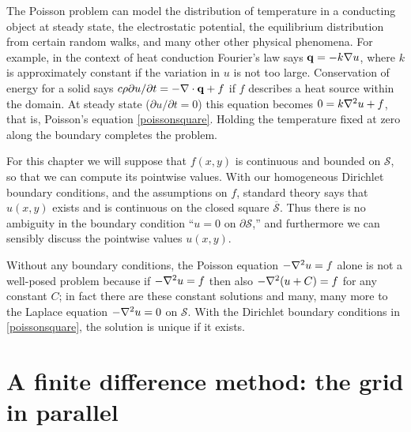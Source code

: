 The Poisson problem can model the distribution of temperature in a conducting object at steady state, the electrostatic potential, the equilibrium distribution from certain random walks, and many other other physical phenomena.  For example, in the context of heat conduction Fourier's law says $\mathbf{q} = -k \nabla u$, where $k$ is approximately constant if the variation in $u$ is not too large.  Conservation of energy for a solid says $c\rho \partial u/\partial t = - \nabla\cdot\mathbf{q} + f$ if $f$ describes a heat source within the domain.  At steady state ($\partial u/\partial t=0$) this equation becomes $0 = k \nabla^2 u + f$, that is, Poisson's equation \eqref{poissonsquare}.  Holding the temperature fixed at zero along the boundary completes the problem.

For this chapter we will suppose that $f(x,y)$ is continuous and bounded on $\mathcal{S}$, so that we can compute its pointwise values.  With our homogeneous Dirichlet boundary conditions, and the assumptions on $f$, standard theory says that $u(x,y)$ exists and is continuous on the closed square $\overline{\mathcal{S}}$.  Thus there is no ambiguity in the boundary condition ``$u=0$ on $\partial \mathcal{S}$,'' and furthermore we can sensibly discuss the pointwise values $u(x,y)$.

Without any boundary conditions, the Poisson equation $-\nabla^2 u = f$ alone is not a well-posed problem because if $-\nabla^2 u = f$ then also $-\nabla^2(u+C)=f$ for any constant $C$; in fact there are these constant solutions and many, many more to the Laplace equation $-\nabla^2 u = 0$ on $\mathcal{S}$.  With the Dirichlet boundary conditions in \eqref{poissonsquare}, the solution is unique if it exists.


\section{A finite difference method: the grid in parallel}


